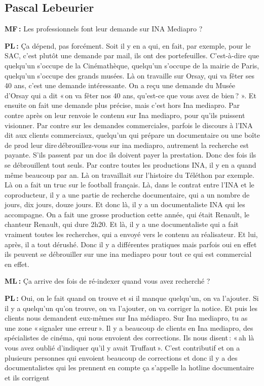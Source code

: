 \subsection*{Pascal Lebeurier}

\textbf{MF :} Les professionnels font leur demande sur INA Mediapro ? 

\textbf{PL :} Ça dépend, pas forcément. Soit il y en a qui, en fait, par exemple, pour le SAC, c'est plutôt une demande par mail, ils ont des portefeuilles. C'est-à-dire que quelqu'un s'occupe de la Cinémathèque, quelqu'un s'occupe de la mairie de Paris, quelqu'un s'occupe des grands musées. Là on travaille sur Orsay, qui va fêter ses 40 ans, c'est une demande intéressante. On a reçu une demande du Musée d'Orsay qui a dit « on va fêter nos 40 ans, qu'est-ce que vous avez de bien ? ». Et ensuite on fait une demande plus précise, mais c'est hors Ina mediapro.  Par contre après on leur renvoie le contenu sur Ina mediapro, pour qu'ils puissent visionner. Par contre sur les demandes commerciales, parfois le discours à l'INA dit aux clients commerciaux, quelqu'un qui prépare un documentaire ou une boîte de prod leur dire débrouillez-vous sur ina mediapro, autrement la recherche est payante. S'ils passent par un doc ils doivent payer la prestation.  Donc des fois ils se débrouillent tout seuls. Par contre toutes les productions INA, il y en a quand même beaucoup par an. Là on travaillait sur l'histoire du Téléthon par exemple. Là on a fait un truc sur le football français. Là, dans le contrat entre l'INA et le coproducteur, il y a une partie de recherche documentaire, qui a un nombre de jours, dix jours, douze jours.  Et donc là, il y a un documentaliste INA qui les accompagne. On a fait une grosse production cette année, qui était Renault, le chanteur Renault, qui dure 2h20. Et là, il y a une documentaliste qui a fait vraiment toutes les recherches, qui a envoyé vers le contenu au réalisateur. Et lui, après, il a tout dérushé. Donc il y a différentes pratiques mais parfois oui en effet ils peuvent se débrouiller sur une ina mediapro pour tout ce qui est commercial en effet. 

\textbf{ML :} Ça arrive des fois de ré-indexer quand vous avez recherché ?  

\textbf{PL :} Oui, on le fait quand on trouve et si il manque quelqu'un, on va l'ajouter.  Si il y a quelqu'un qu'on trouve, on va l'ajouter, on va corriger la notice.  Et puis les clients nous demandent eux-mêmes sur Ina médiapro. Sur Ina mediapro, tu as une zone « signaler une erreur ».  Il y a beaucoup de clients en Ina mediapro, des spécialistes de cinéma, qui nous envoient des corrections. Ils nous disent : « ah là vous avez oublié d'indiquer qu'il y avait Truffaut ». C'est contributif et on a plusieurs personnes qui envoient beaucoup de corrections et donc il y a des documentalistes qui les prennent en compte ça s'appelle la hotline documentaire et ils corrigent 


